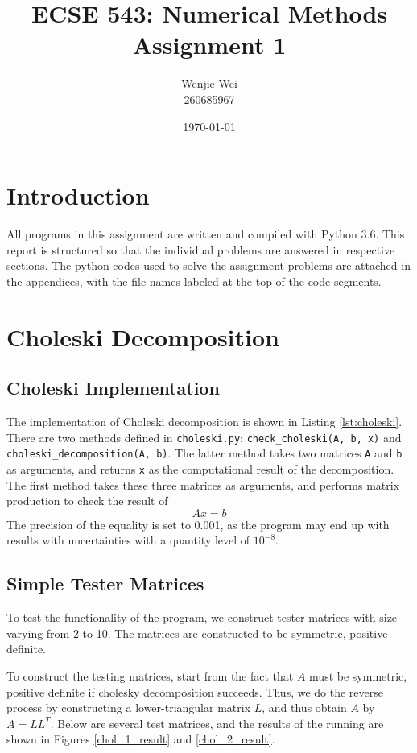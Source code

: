 \documentclass[a4paper,titlepage]{article}
\title{\textbf{ECSE 543: Numerical Methods} \\ Assignment 1}
\author{Wenjie Wei \\ 260685967}
\date{\today}
\begin{document}
	\sloppy
	\maketitle
	
	\tableofcontents
	
	
	\twocolumn
	
	\section{Introduction}
	
	All programs in this assignment are written and compiled with Python 3.6. This report is structured so that the individual problems are answered in respective sections. The python codes used to solve the assignment problems are attached in the appendices, with the file names labeled at the top of the code segments.
	
	\section{Choleski Decomposition}
		\subsection{Choleski Implementation}
			The implementation of Choleski decomposition is shown in Listing \ref{lst:choleski}. There are two methods defined in \texttt{choleski.py}: \texttt{check_choleski(A, b, x)} and \texttt{choleski_decomposition(A, b)}. The latter method takes two matrices \texttt{A} and \texttt{b} as arguments, and returns \texttt{x} as the computational result of the decomposition. The first method takes these three matrices as arguments, and performs matrix production to check the result of
			$$
				Ax = b
			$$ 
			The precision of the equality is set to 0.001, as the program may end up with results with uncertainties with a quantity level of $10^{-8}$.
			
		\subsection{Simple Tester Matrices}
			To test the functionality of the program, we construct tester matrices with size varying from 2 to 10. The matrices are constructed to be symmetric, positive definite. 
			
			To construct the testing matrices, start from the fact that $A$ must be symmetric, positive definite if cholesky decomposition succeeds. Thus, we do the reverse process by constructing a lower-triangular matrix $L$, and thus obtain $A$ by $A = LL^T$. Below are several test matrices, and the results of the running are shown in Figures \ref{chol_1_result} and \ref{chol_2_result}.
			
\end{document}
